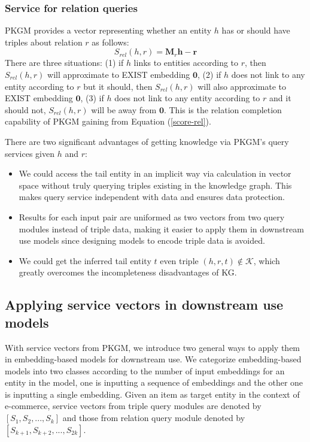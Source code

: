 


\subsubsection{Service for relation queries}
PKGM provides a vector representing whether an entity $h$ has or should have triples about relation $r$ as follows:
\begin{equation}
    S_{rel}(h, r) = \mathbf{M}_r \mathbf{h} - \mathbf{r} 
\end{equation}
There are three situations: (1) if $h$ links to entities according to $r$, then  $S_{rel}(h, r)$ will approximate to EXIST embedding $\mathbf{0}$, (2) if $h$ does not link to any entity according to $r$ but it should, then $S_{rel}(h, r)$ will also approximate to EXIST embedding $\mathbf{0}$, (3) if $h$ does not link to any entity according to $r$ and it should not, $S_{rel}(h, r)$ will be away from  $\mathbf{0}$. This is the relation completion capability of PKGM gaining from Equation (\ref{score-rel}). 

There are two significant advantages  of getting knowledge via PKGM's query services given $h$ and $r$: 
\begin{itemize}
\item We could access the tail entity in an implicit way via calculation in vector space without truly querying triples existing in the knowledge graph. This makes query service independent with data and ensures data protection. 
\item Results for each input pair are uniformed as two vectors from two query modules instead of triple data,  making it easier to apply them in downstream use models since designing models to encode triple data is avoided.  
\item We could get the inferred tail entity $t$ even triple $(h,r,t) \notin \mathcal{K}$, which greatly overcomes the incompleteness disadvantages of KG.   
\end{itemize}


\subsection{Applying service vectors in downstream use models}
With service vectors from PKGM, we introduce two general ways to apply them in embedding-based models for downstream use. We categorize embedding-based models into two classes according to the number of input embeddings for an entity in the model, one is inputting a sequence of  embeddings and the other one is inputting a single embedding. Given an item as target entity in the context of e-commerce, service vectors from triple query modules are denoted by $[S_1, S_2, ..., S_k]$ and those from relation query module denoted by $[S_{k+1}, S_{k+2}, ..., S_{2k}]$. 

